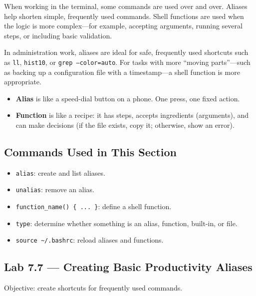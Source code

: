 When working in the terminal, some commands are used over and over. Aliases
help shorten simple, frequently used commands. Shell functions are used when
the logic is more complex---for example, accepting arguments, running several
steps, or including basic validation.

In administration work, aliases are ideal for safe, frequently used shortcuts
such as \texttt{ll}, \texttt{hist10}, or \texttt{grep --color=auto}. For
tasks with more ``moving parts''---such as backing up a configuration file
with a timestamp---a shell function is more appropriate.

\begin{examplebox}
  \begin{itemize}
    \item \textbf{Alias} is like a speed-dial button on a phone. One press,
      one fixed action.
    \item \textbf{Function} is like a recipe: it has steps, accepts
      ingredients (arguments), and can make decisions (if the file exists,
      copy it; otherwise, show an error).
  \end{itemize}
\end{examplebox}

\subsection*{Commands Used in This Section}

\begin{itemize}
  \item \texttt{alias}: create and list aliases.
  \item \texttt{unalias}: remove an alias.
  \item \texttt{function\_name() \{ ... \}}: define a shell function.
  \item \texttt{type}: determine whether something is an alias, function,
    built-in, or file.
  \item \texttt{source \textasciitilde/.bashrc}: reload aliases and functions.
\end{itemize}

\subsection*{Lab 7.7 --- Creating Basic Productivity Aliases}

Objective: create shortcuts for frequently used commands.

